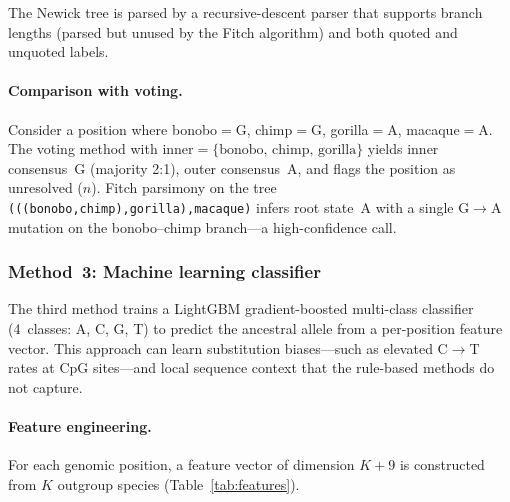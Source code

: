 \documentclass[11pt,a4paper]{article}
\begin{document}
The Newick tree is parsed by a recursive-descent parser that supports branch
lengths (parsed but unused by the Fitch algorithm) and both quoted and
unquoted labels.

\paragraph{Comparison with voting.}
Consider a position where bonobo$=$G, chimp$=$G, gorilla$=$A, macaque$=$A.
The voting method with inner$=\{\text{bonobo, chimp, gorilla}\}$ yields inner
consensus~G (majority 2:1), outer consensus~A, and flags the position as
unresolved ($n$). Fitch parsimony on the tree
\texttt{(((bonobo,chimp),gorilla),macaque)} infers root state~A with a single
G$\to$A mutation on the bonobo--chimp branch---a high-confidence call.

\subsubsection{Method~3: Machine learning classifier}
\label{sec:ml}

The third method trains a LightGBM \citep{Ke2017} gradient-boosted
multi-class classifier (4~classes: A, C, G, T) to predict the ancestral
allele from a per-position feature vector. This approach can learn
substitution biases---such as elevated C$\to$T rates at CpG sites---and local
sequence context that the rule-based methods do not capture.

\paragraph{Feature engineering.}
For each genomic position, a feature vector of dimension $K + 9$ is
constructed from $K$ outgroup species (Table~\ref{tab:features}).
\end{document}
